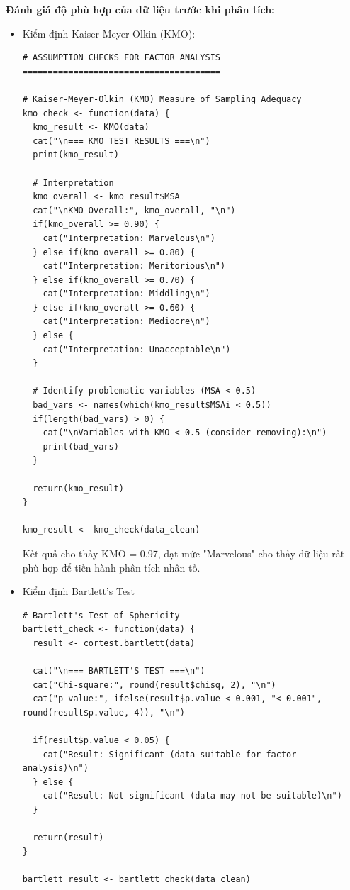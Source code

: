\textbf{Đánh giá độ phù hợp của dữ liệu trước khi phân tích:}
\begin{itemize}
    \item Kiểm định Kaiser-Meyer-Olkin (KMO):
    \begin{lstlisting}
# ASSUMPTION CHECKS FOR FACTOR ANALYSIS =======================================

# Kaiser-Meyer-Olkin (KMO) Measure of Sampling Adequacy
kmo_check <- function(data) {
  kmo_result <- KMO(data)
  cat("\n=== KMO TEST RESULTS ===\n")
  print(kmo_result)
  
  # Interpretation
  kmo_overall <- kmo_result$MSA
  cat("\nKMO Overall:", kmo_overall, "\n")
  if(kmo_overall >= 0.90) {
    cat("Interpretation: Marvelous\n")
  } else if(kmo_overall >= 0.80) {
    cat("Interpretation: Meritorious\n")
  } else if(kmo_overall >= 0.70) {
    cat("Interpretation: Middling\n")
  } else if(kmo_overall >= 0.60) {
    cat("Interpretation: Mediocre\n")
  } else {
    cat("Interpretation: Unacceptable\n")
  }
  
  # Identify problematic variables (MSA < 0.5)
  bad_vars <- names(which(kmo_result$MSAi < 0.5))
  if(length(bad_vars) > 0) {
    cat("\nVariables with KMO < 0.5 (consider removing):\n")
    print(bad_vars)
  }
  
  return(kmo_result)
}

kmo_result <- kmo_check(data_clean)
    \end{lstlisting}
    
    Kết quả cho thấy KMO = 0.97, đạt mức "Marvelous" cho thấy dữ liệu rất phù hợp để tiến hành phân tích nhân tố.

\item Kiểm định Bartlett's Test
    \begin{lstlisting}[caption={Code kiểm định Bartlett's Test}]
# Bartlett's Test of Sphericity
bartlett_check <- function(data) {
  result <- cortest.bartlett(data)
  
  cat("\n=== BARTLETT'S TEST ===\n")
  cat("Chi-square:", round(result$chisq, 2), "\n")
  cat("p-value:", ifelse(result$p.value < 0.001, "< 0.001", round(result$p.value, 4)), "\n")
  
  if(result$p.value < 0.05) {
    cat("Result: Significant (data suitable for factor analysis)\n")
  } else {
    cat("Result: Not significant (data may not be suitable)\n")
  }
  
  return(result)
}

bartlett_result <- bartlett_check(data_clean)
    \end{lstlisting}
\end{itemize}

